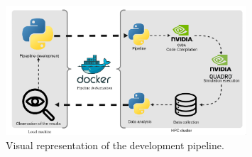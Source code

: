 \begin{figure}
  \centering
  \includegraphics[width=0.8\textwidth]{pipeline}
  \caption{Visual representation of the development pipeline.}
  \label{fig:pipeline}
\end{figure}
